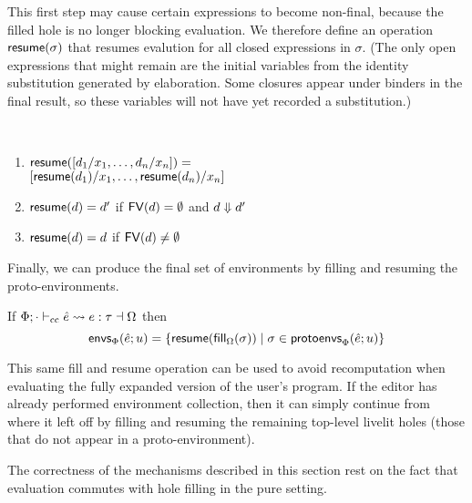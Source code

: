 This first step may cause certain expressions to become non-final, because the filled hole is no longer
blocking evaluation. We therefore define an operation $\mathsf{resume}(\sigma)$ that resumes evalution for all closed expressions in $\sigma$.
(The only open expressions that might remain are the initial variables from the identity substitution generated by elaboration. Some closures appear under binders in the final result, so these variables will not have yet recorded a substitution.)
\begin{definition} ~
    \begin{enumerate}
        \item $\mathsf{resume}([d_1/x_1, \ldots, d_n/x_n]) = $\\
        $[\mathsf{resume}(d_1)/x_1, \ldots, \mathsf{resume}(d_n)/x_n]$
        \item $\mathsf{resume}(d) = d'$ if $\mathsf{FV}(d) = \emptyset$ and $d \Downarrow d'$
        \item $\mathsf{resume}(d) = d$ if $\mathsf{FV}(d) \neq \emptyset$
    \end{enumerate}
\end{definition}

Finally, we can produce the final set of environments by filling and resuming the proto-environments.
\begin{definition}
    If $\Phi; \cdot \vdash_\text{cc} \hat e \leadsto e : \tau \dashv \Omega$
    then \[\mathsf{envs}_{\Phi}(\hat e; u) = \{\mathsf{resume}(\mathsf{fill}_{\Omega}(\sigma)) \mid \sigma \in \mathsf{protoenvs}_{\Phi}(\hat e; u)\}\]
\end{definition}

This same fill and resume operation can be used to avoid recomputation when evaluating the fully expanded version of the user's program.
If the editor has already performed environment collection, then it can simply continue from where it left off
by filling and resuming
the remaining top-level livelit holes (those that do not appear in a proto-environment).

The correctness of the mechanisms described in this section rest on the fact that evaluation commutes with hole filling
in the pure setting.

